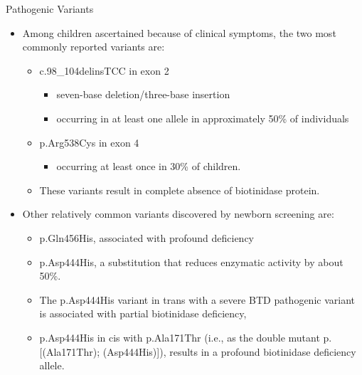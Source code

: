 \documentclass[presentation, smaller]{beamer}
\begin{document}
\begin{frame}[label={sec:orgheadline3}]{Pathogenic Variants}
\begin{itemize}
\item Among children ascertained because of clinical symptoms, the two
most commonly reported variants are:

\begin{itemize}
\item c.98\_104delinsTCC in exon 2
\begin{itemize}
\item seven-base deletion/three-base insertion
\item occurring in at least one allele in approximately 50\% of individuals
\end{itemize}

\item p.Arg538Cys in exon 4
\begin{itemize}
\item occurring at least once in 30\% of children.
\end{itemize}

\item These variants result in complete absence of biotinidase protein.
\end{itemize}

\item Other relatively common variants discovered by newborn screening are:
\begin{itemize}
\item p.Gln456His, associated with profound deficiency

\item p.Asp444His, a substitution that reduces enzymatic activity by about 50\%.

\item The p.Asp444His variant in trans with a severe BTD pathogenic variant is associated with partial biotinidase deficiency,
\item p.Asp444His in cis with p.Ala171Thr (i.e., as the double mutant p.[(Ala171Thr); (Asp444His)]), results in a profound biotinidase deficiency allele.
\end{itemize}
\end{itemize}
\end{frame}
\end{document}
